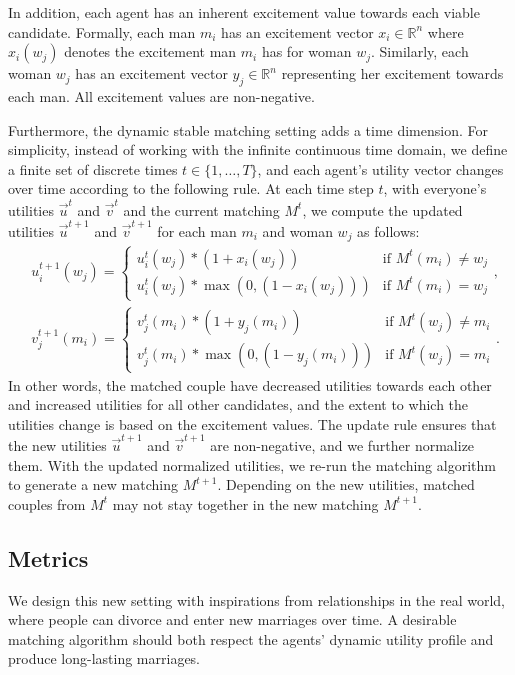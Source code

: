 In addition, each agent has an inherent excitement value towards each viable candidate. Formally, each man $m_i$ has an excitement vector $x_i \in \mathbb{R}^n$ where $x_i(w_j)$ denotes the excitement man $m_i$ has for woman $w_j$. Similarly, each woman $w_j$ has an excitement vector $y_j \in \mathbb{R}^n$ representing her excitement towards each man. All excitement values are non-negative.

Furthermore, the dynamic stable matching setting adds a time dimension. For simplicity, instead of working with the infinite continuous time domain, we define a finite set of discrete times $t \in \{1, \ldots, T\}$, and each agent's utility vector changes over time according to the following rule. At each time step $t$, with everyone's utilities $\overrightarrow{u}^{t}$ and $\overrightarrow{v}^{t}$ and the current matching $M^t$, we compute the updated utilities $\overrightarrow{u}^{t+1}$ and $\overrightarrow{v}^{t+1}$ for each man $m_i$ and woman $w_j$ as follows:
    \begin{align*}
        & u^{t+1}_i(w_j) = \begin{cases} u^t_i(w_j) * (1 + x_i(w_j)) &\text{if $M^t(m_i) \neq w_j$} \\ u^t_i(w_j) * \max(0, (1 - x_i(w_j))) &\text{if $M^t(m_i) = w_j$} \end{cases},\\
        & v^{t+1}_j(m_i) = \begin{cases} v^t_j(m_i) * (1 + y_j(m_i)) &\text{if $M^t(w_j) \neq m_i$} \\ v^t_j(m_i) * \max(0, (1 - y_j(m_i))) &\text{if $M^t(w_j) = m_i$} \end{cases}.
    \end{align*}
In other words, the matched couple have decreased utilities towards each other and increased utilities for all other candidates, and the extent to which the utilities change is based on the excitement values. The update rule ensures that the new utilities $\overrightarrow{u}^{t+1}$ and $\overrightarrow{v}^{t+1}$ are non-negative, and we further normalize them. With the updated normalized utilities, we re-run the matching algorithm to generate a new matching $M^{t+1}$. Depending on the new utilities, matched couples from $M^t$ may not stay together in the new matching $M^{t+1}$.


\subsection{Metrics}
We design this new setting with inspirations from relationships in the real world, where people can divorce and enter new marriages over time. A desirable matching algorithm should both respect the agents' dynamic utility profile and produce long-lasting marriages.

